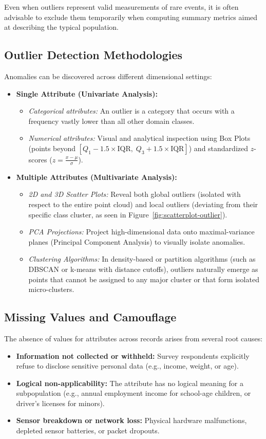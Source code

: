 Even when outliers represent valid measurements of rare events, it is often advisable to exclude them temporarily when computing summary metrics aimed at describing the typical population.

\subsection{Outlier Detection Methodologies}
Anomalies can be discovered across different dimensional settings:
\begin{itemize}
    \item \textbf{Single Attribute (Univariate Analysis):}
    \begin{itemize}
        \item \textit{Categorical attributes:} An outlier is a category that occurs with a frequency vastly lower than all other domain classes.
        \item \textit{Numerical attributes:} Visual and analytical inspection using Box Plots (points beyond $[Q_1 - 1.5 \times \text{IQR}, \; Q_3 + 1.5 \times \text{IQR}]$) and standardized $z$-scores ($z = \frac{x - \mu}{\sigma}$).
    \end{itemize}
    \item \textbf{Multiple Attributes (Multivariate Analysis):}
    \begin{itemize}
        \item \textit{2D and 3D Scatter Plots:} Reveal both global outliers (isolated with respect to the entire point cloud) and local outliers (deviating from their specific class cluster, as seen in Figure~\ref{fig:scatterplot-outlier}).
        \item \textit{PCA Projections:} Project high-dimensional data onto maximal-variance planes (Principal Component Analysis) to visually isolate anomalies.
        \item \textit{Clustering Algorithms:} In density-based or partition algorithms (such as DBSCAN or k-means with distance cutoffs), outliers naturally emerge as points that cannot be assigned to any major cluster or that form isolated micro-clusters.
    \end{itemize}
\end{itemize}

\subsection{Missing Values and Camouflage}
The absence of values for attributes across records arises from several root causes:
\begin{itemize}
    \item \textbf{Information not collected or withheld:} Survey respondents explicitly refuse to disclose sensitive personal data (e.g., income, weight, or age).
    \item \textbf{Logical non-applicability:} The attribute has no logical meaning for a subpopulation (e.g., annual employment income for school-age children, or driver's licenses for minors).
    \item \textbf{Sensor breakdown or network loss:} Physical hardware malfunctions, depleted sensor batteries, or packet dropouts.
\end{itemize}

